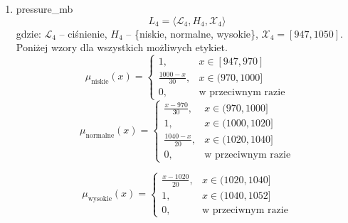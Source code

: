 \documentclass{article}
\begin{document}
\begin{enumerate}
    \item pressure\_mb
        \begin{equation}
            L_4 = \langle \mathcal{L}_4, H_4, \mathcal{X}_4 \rangle
        \end{equation}
        gdzie: $\mathcal{L}_4$ – ciśnienie, $H_4$ – \{niskie, normalne, wysokie\}, $\mathcal{X}_4 = [947, 1050]$. \\
        Poniżej wzory dla wszystkich możliwych etykiet.
                \begin{equation}
                    \mu_{\text{niskie}}(x) =
                    \begin{cases}
                    1, & x \in [947, 970] \\
                    \frac{1000 - x}{30}, & x \in (970, 1000] \\
                    0, & \text{w przeciwnym razie}
                    \end{cases}
              \end{equation}
                \begin{equation}
                   \mu_{\text{normalne}}(x) =
                    \begin{cases}
                    \frac{x - 970}{30}, & x \in (970, 1000] \\
                    1, & x \in (1000, 1020] \\
                    \frac{1040 - x}{20}, & x \in (1020, 1040] \\
                    0, & \text{w przeciwnym razie}
                    \end{cases}
                \end{equation}

                \begin{equation}
                \mu_{\text{wysokie}}(x) =
                    \begin{cases}
                    \frac{x - 1020}{20}, & x \in (1020, 1040] \\
                    1, & x \in (1040, 1052] \\
                    0, & \text{w przeciwnym razie}
                    \end{cases}
                \end{equation}


\end{enumerate}
\end{document}
